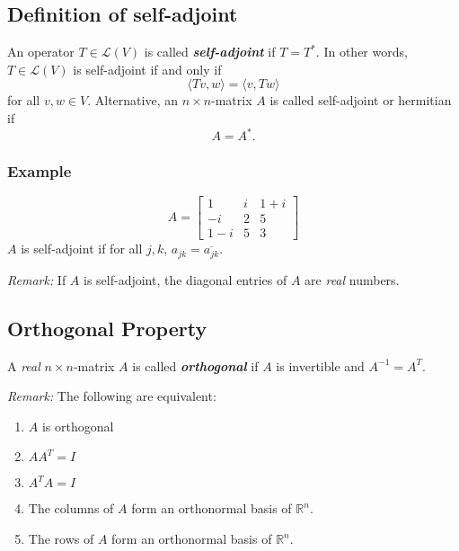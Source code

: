 \documentclass[11pt]{article}
\begin{document}
    \subsection{Definition of self-adjoint}

    An operator \(T \in \mathcal{L}(V)\) is called \textbf{\emph{self-adjoint}} if \(T = T^*\). In other words, \(T \in \mathcal{L}(V)\) is self-adjoint if and only if \[\langle Tv, w \rangle = \langle v, Tw \rangle\] for all \(v,w \in V\). Alternative, an \(n \times n\)-matrix $A$ is called self-adjoint or hermitian if \[A = A^*.\]

    \subsubsection{Example}

    \[A = \begin{bmatrix}
        1 & i & 1+i \\
        -i & 2 & 5 \\
        1-i & 5 & 3
    \end{bmatrix}\] $A$ is self-adjoint if for all \(j,k\), \(a_{jk} = \overline{a_{jk}}\). 

    \emph{Remark:} If $A$ is self-adjoint, the diagonal entries of $A$ are \emph{real} numbers. 

    \subsection{Orthogonal Property}

    A \emph{real} \(n \times n\)-matrix $A$ is called \textbf{\emph{orthogonal}} if $A$ is invertible and \(A^{-1} = A^T\).

    \vspace{1em}

    \emph{Remark:} The following are equivalent:
    \begin{enumerate}
        \item $A$ is orthogonal
        \item \(AA^T = I\)
        \item \(A^T A = I\)
        \item The columns of $A$ form an orthonormal basis of \(\mathbb{R}^n\).
        \item The rows of $A$ form an orthonormal basis of \(\mathbb{R}^n\). 
    \end{enumerate}
\end{document}
